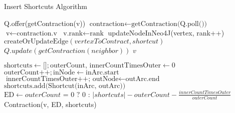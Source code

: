 \begin{algorithm}
    \caption{Insert Shortcuts Algorithm}
    \label{alg:contraction}
    \begin{algorithmic}[1]
        \State Q.offer(getContraction(v))
    \EndFor
    \State $\text{contraction} \gets \text{getContraction(Q.poll())}$
    \State $\text{v} \gets \text{contraction.v}$
    \State $\text{v.rank} \gets \text{rank}$
    \State updateNodeInNeo4J(vertex, rank++)
        \State $\text{createOrUpdateEdge}(vertexToContract, shortcut)$
    \EndFor
        \State $Q.update(getContraction(neighbor))$
    \EndFor
    \EndWhile
    \State \Return $v$
    \EndFunction

    \State$\text{shortcuts} \gets \text{[]}; \text{outerCount, innerCountTimesOuter} \gets 0$
            \State $\text{outerCount++}; \text{inNode} \gets \text{inArc.start}$
                    \State $\text{innerCountTimesOuter++; } \text{outNode} \gets \text{outArc.end}$
                     $\text{shortcuts.add(Shortcut(inArc, outArc))} $ 
                    \EndIf
                \EndIf
            \EndFor
        \EndIf
    \EndFor
    \State $\text{ED} \gets outerCount \text{ = 0 ? 0 : } |shortcuts| - outerCount - \frac{innerCountTimesOuter}{outerCount}$
    \State \Return Contraction(v, ED, shortcuts)
    \EndFunction
    \end{algorithmic}
\end{algorithm}